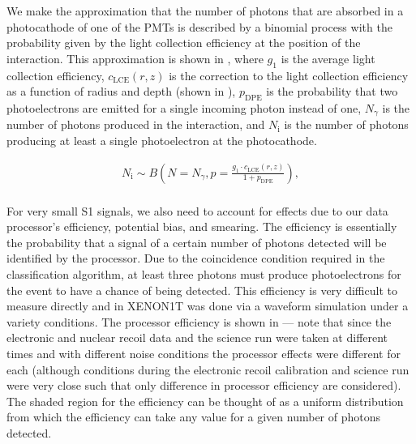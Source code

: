 We make the approximation that the number of photons that are absorbed in a photocathode of one of the PMTs is described by a binomial process with the probability given by the light collection efficiency at the position of the interaction.  This approximation is shown in , where $g_1$ is the average light collection efficiency, $c_{\textrm{LCE}}(r, z)$ is the correction to the light collection efficiency as a function of radius and depth (shown in ), $p_{\textrm{DPE}}$ is the probability that two photoelectrons are emitted for a single incoming photon instead of one, $N_{\gamma}$ is the number of photons produced in the interaction, and $N_{\textrm{i}}$ is the number of photons producing at least a single photoelectron at the photocathode.  


\begin{equation}
        \label{eqn:xe1t_binomial_lce}
        \begin{gathered}
                N_{\textrm{i}} \sim B \left( N = N_{\gamma}, p = \frac{g_1 \cdot c_{\textrm{LCE}}(r, z)}{1 + p_{\textrm{DPE}}} \right), \\
        \end{gathered}
\end{equation}


For very small S1 signals, we also need to account for effects due to our data processor's efficiency, potential bias, and smearing.  The efficiency is essentially the probability that a signal of a certain number of photons detected will be identified by the processor.  Due to the coincidence condition required in the classification algorithm, at least three photons must produce photoelectrons for the event to have a chance of being detected.  This efficiency is very difficult to measure directly and in XENON1T was done via a waveform simulation under a variety conditions.  The processor efficiency is shown in  --- note that since the electronic and nuclear recoil data and the science run were taken at different times and with different noise conditions the processor effects were different for each (although conditions during the electronic recoil calibration and science run were very close such that only difference in processor efficiency are considered).  The shaded region for the efficiency can be thought of as a uniform distribution from which the efficiency can take any value for a given number of photons detected.


